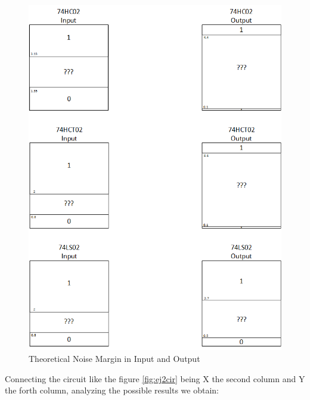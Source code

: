 	 \begin{figure}[h!]
        \centering
        \includegraphics[scale=0.5]{dataaa2.png}
        \caption{\color{cyan}Theoretical Noise Margin in Input and Output}
        \label{fig:ej2thnm}
    \end{figure}
    
    Connecting the circuit like the figure \ref{fig:ej2cir} being X the second column and Y the forth column, analyzing the possible results we obtain:


